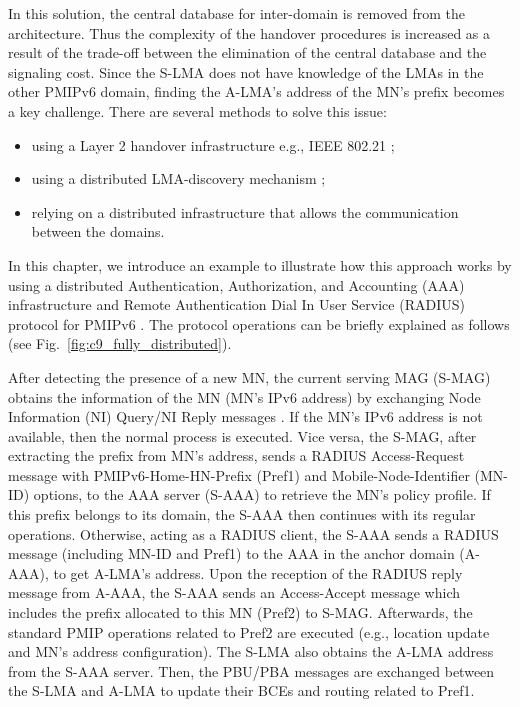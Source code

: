 In this solution, the central database for inter-domain is removed from the architecture. Thus the complexity of the handover procedures is increased as a result of the trade-off between the elimination of the central database and the signaling cost. Since the S-LMA does not have knowledge of the LMAs in the other PMIPv6 domain, finding the A-LMA's address of the MN's prefix becomes a key challenge. There are several methods to solve this issue:
\begin{itemize}
\item using a Layer 2 handover infrastructure e.g., IEEE 802.21 \cite{IEEE802.21};
\item using a distributed LMA-discovery mechanism \cite{lma_discovery};
\item relying on a distributed infrastructure that allows the communication between the domains. 
\end{itemize}

In this chapter, we introduce an example to illustrate how this approach works by using a distributed Authentication, Authorization, and Accounting (AAA) infrastructure \cite{aaa2} and Remote Authentication Dial In User Service (RADIUS) protocol for PMIPv6 \cite{radius}. The protocol operations can be briefly explained as follows (see Fig.~\ref{fig:c9_fully_distributed}). 

After detecting the presence of a new MN, the current serving MAG (S-MAG) obtains the information of the MN (MN's IPv6 address) by exchanging Node Information (NI) Query/NI Reply messages \cite{rfc4620}. If the MN's IPv6 address is not available, then the normal process is executed. Vice versa, the S-MAG, after extracting the prefix from MN's address, sends a RADIUS Access-Request message with PMIPv6-Home-HN-Prefix (Pref1) and Mobile-Node-Identifier (MN-ID) options, to the AAA server (S-AAA) to retrieve the MN's policy profile. If this prefix belongs to its domain, the S-AAA then continues with its regular operations. Otherwise, acting as a RADIUS client, the S-AAA sends a RADIUS message (including MN-ID and Pref1) to the AAA in the anchor domain (A-AAA), to get A-LMA's address. Upon the reception of the RADIUS reply message from A-AAA, the S-AAA sends an Access-Accept message which includes the prefix allocated to this MN (Pref2) to S-MAG. Afterwards, the standard PMIP operations related to Pref2 are executed (e.g., location update and MN's address configuration). The S-LMA also obtains the A-LMA address from the S-AAA server. Then, the PBU/PBA messages are exchanged between the S-LMA and A-LMA to update their BCEs and routing related to Pref1. 

